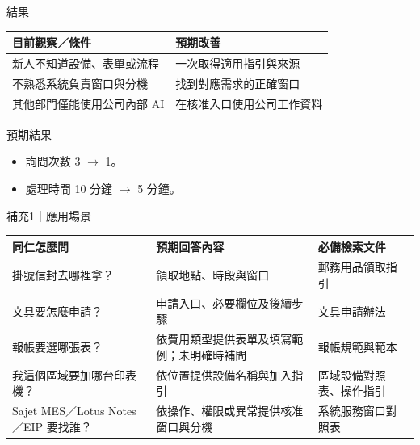 \documentclass[aspectratio=169,12pt]{beamer}
\begin{document}
\begin{frame}{結果}
\centering
\footnotesize
\begin{tabular}{p{}p{}}
\toprule
目前觀察／條件 & 預期改善 \\
\midrule
新人不知道設備、表單或流程 & 一次取得適用指引與來源 \\
\addlinespace[0.6em]
不熟悉系統負責窗口與分機 & 找到對應需求的正確窗口 \\
\addlinespace[0.6em]
其他部門僅能使用公司內部 AI & 在核准入口使用公司工作資料 \\
\bottomrule
\end{tabular}
\begin{alertblock}{預期結果}
\begin{itemize}
\item 詢問次數 3 $\rightarrow$ 1。 
\item 處理時間 10 分鐘 $\rightarrow$ 5 分鐘。
\end{itemize}
\end{alertblock}
\end{frame}

\begin{frame}{補充1｜應用場景}
\footnotesize
\begin{tabular}{p{}p{}p{}}
\toprule
同仁怎麼問 & 預期回答內容 & 必備檢索文件 \\
\midrule
掛號信封去哪裡拿？ & 領取地點、時段與窗口 & 郵務用品領取指引 \\
\addlinespace[0.5em]
文具要怎麼申請？ & 申請入口、必要欄位及後續步驟 & 文具申請辦法 \\
\addlinespace[0.5em]
報帳要選哪張表？ & 依費用類型提供表單及填寫範例；未明確時補問 & 報帳規範與範本 \\
\addlinespace[0.5em]
我這個區域要加哪台印表機？ & 依位置提供設備名稱與加入指引 & 區域設備對照表、操作指引 \\
\addlinespace[0.5em]
Sajet MES／Lotus Notes／EIP 要找誰？ & 依操作、權限或異常提供核准窗口與分機 & 系統服務窗口對照表 \\
\bottomrule
\end{tabular}
\end{frame}
\end{document}
